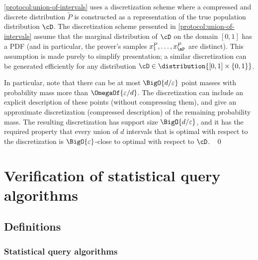 \documentclass{toc}
\begin{document}
\begin{remark}
	\cref{protocol:union-of-intervals} uses a discretization scheme where a compressed and discrete distribution $\tilde{P}$ is constructed as a  representation of the true population distribution $\cD$. The discretization scheme presented in \cref{protocol:union-of-intervals} assume that the marginal distribution of $\cD$ on the domain $[0,1]$ has a PDF (and in particular, the prover's samples $x_1^P,\dots,x_{\mP}^P$ are distinct). This assumption is made purely to simplify presentation; a similar discretization can be generated efficiently for any distribution $\cD \in \distribution{[0,1]\times \{0,1\}}$. 
	
	In particular, note that there can be at most $\BigO{d/\varepsilon}$ point masses with probability mass more than $\OmegaOf{\varepsilon/d}$. The discretization can include an explicit description of these points (without compressing them), and give an approximate discretization (compressed description) of the remaining probability mass. The resulting discretization has support size $\BigO{d/\varepsilon}$, and it has the required property that every union of $d$ intervals that is optimal with respect to the discretization is $\BigO{\varepsilon}$-close to optimal with respect to $\cD$.
	~\qed 
\end{remark}

\section{Verification of statistical query algorithms}\label{section:sq-algorithm-verification}

\subsection{Definitions}

\subsubsection{Statistical query algorithms}

\end{document}
